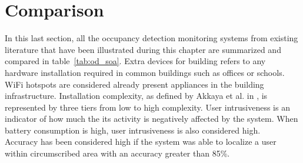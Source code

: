 \section{Comparison}
\label{sec:comparison}

In this last section, all the occupancy detection monitoring systems from existing literature that have been illustrated during this chapter are summarized and compared in table~\ref{tab:od_soa}. Extra devices for building refers to any hardware installation required in common buildings such as offices or schools. WiFi hotspots are considered already present appliances in the building infrastructure. Installation complexity, as defined by Akkaya et al. in \cite{Akkaya2015}, is represented by three tiers from low to high complexity. User intrusiveness is an indicator of how much the its activity is negatively affected by the system. When battery consumption is high, user intrusiveness is also considered high.\\
Accuracy has been considered high if the system was able to localize a user within circumscribed area with an accuracy greater than 85\%. 
%
%
